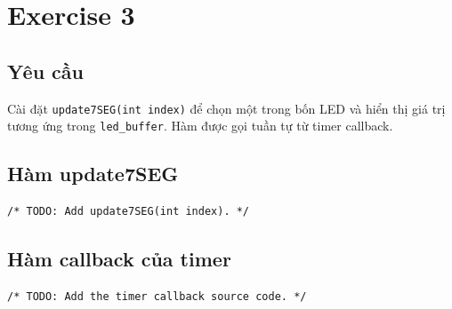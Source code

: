 \section{Exercise 3}

\subsection{Yêu cầu}
Cài đặt \texttt{update7SEG(int index)} để chọn một trong bốn LED và hiển thị giá
trị tương ứng trong \texttt{led\_buffer}. Hàm được gọi tuần tự từ timer callback.

\subsection{Hàm update7SEG}
\begin{lstlisting}[caption={update7SEG -- Exercise 3}]
/* TODO: Add update7SEG(int index). */
\end{lstlisting}

\subsection{Hàm callback của timer}
\begin{lstlisting}[caption={Timer callback -- Exercise 3}]
/* TODO: Add the timer callback source code. */
\end{lstlisting}
